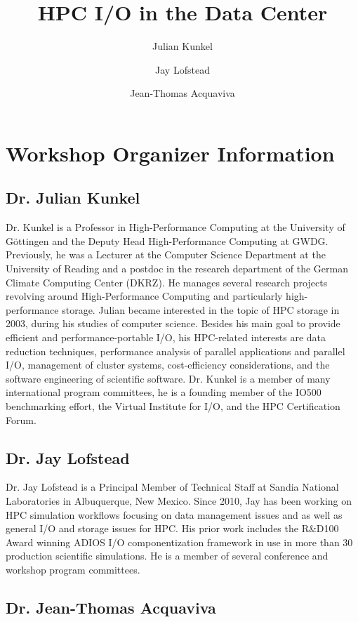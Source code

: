 \documentclass[a4paper,10pt]{article}
\title{HPC I/O in the Data Center}
\author{Julian Kunkel \and Jay Lofstead \and Jean-Thomas Acquaviva}
\begin{document}
\maketitle



\section{Workshop Organizer Information}

\subsection{Dr. Julian Kunkel}
Dr. Kunkel is a Professor in High-Performance Computing at the University of Göttingen and the Deputy Head High-Performance Computing at GWDG. Previously, he was a Lecturer at the Computer Science Department at the University of Reading and a postdoc in the research department of the German Climate Computing Center (DKRZ).
He manages several research projects revolving around High-Performance Computing and particularly high-performance storage. Julian became interested in the topic of HPC storage in 2003, during his studies of computer science. Besides his main goal to provide efficient and performance-portable I/O, his HPC-related interests are data reduction techniques, performance analysis of parallel applications and parallel I/O, management of cluster systems, cost-efficiency considerations, and the software engineering of scientific software. Dr. Kunkel is a member of many international program committees, he is a founding member of the IO500 benchmarking effort, the Virtual Institute for I/O, and the HPC Certification Forum. 

\subsection{Dr. Jay Lofstead}
Dr. Jay Lofstead is a Principal Member of Technical Staff at Sandia National
Laboratories in Albuquerque, New Mexico. Since 2010, Jay has been working on
HPC simulation workflows focusing on data management issues and as well as
general I/O and storage issues for HPC.  His prior work includes the R\&D100
Award winning ADIOS I/O componentization framework in use in more than 30
production scientific simulations. He is a member of several conference and
workshop program committees.

\subsection{Dr. Jean-Thomas Acquaviva}
\end{document}
